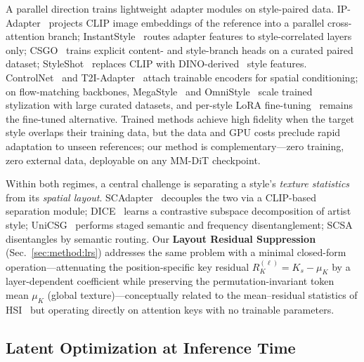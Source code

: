 A parallel direction trains lightweight adapter modules on style-paired data.
IP-Adapter~\cite{ipadapter2023} projects CLIP image embeddings of the
reference into a parallel cross-attention branch;
InstantStyle~\cite{wang2024instantstyle} routes adapter features to
style-correlated layers only; CSGO~\cite{xing2024csgo} trains explicit
content- and style-branch heads on a curated paired dataset;
StyleShot~\cite{gao2024styleshot} replaces CLIP with
DINO-derived~\cite{oquab2024dinov2} style features.
ControlNet~\cite{zhang2023controlnet} and
T2I-Adapter~\cite{mou2024t2iadapter} attach trainable encoders for spatial
conditioning; on flow-matching backbones, MegaStyle~\cite{megastyle2026} and
OmniStyle~\cite{omnistyle2025} scale trained stylization with large curated
datasets, and per-style LoRA fine-tuning~\cite{hu2022lora} remains the
fine-tuned alternative.
Trained methods achieve high fidelity when the target style overlaps their
training data, but the data and GPU costs preclude rapid adaptation to unseen
references; our method is complementary---zero training, zero external data,
deployable on any MM-DiT checkpoint.

Within both regimes, a central challenge is separating a style's
\emph{texture statistics} from its \emph{spatial layout}.
SCAdapter~\cite{scadapter2026} decouples the two via a CLIP-based separation
module; DICE~\cite{dice2026} learns a contrastive subspace decomposition of
artist style; UniCSG~\cite{unicsg2026} performs staged semantic and frequency
disentanglement; SCSA~\cite{scsa2025} disentangles by semantic routing.
Our \textbf{Layout Residual Suppression} (Sec.~\ref{sec:method:lrs}) addresses
the same problem with a minimal closed-form operation---attenuating the
position-specific key residual $R_K^{(\ell)} = K_s - \mu_K$ by a
layer-dependent coefficient while preserving the permutation-invariant token
mean $\mu_K$ (global texture)---conceptually related to the mean--residual
statistics of HSI~\cite{hsi2025} but operating directly on attention keys with
no trainable parameters.

\subsection{Latent Optimization at Inference Time}

